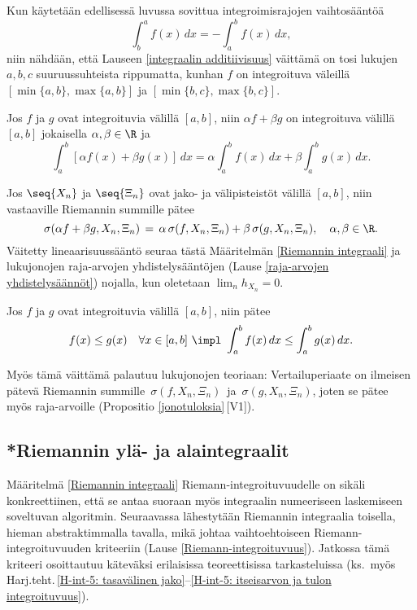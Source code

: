 Kun käytetään edellisessä luvussa sovittua integroimisrajojen vaihtosääntöä
\[
\int_b^a f(x)\, dx=-\int_a^b f(x)\, dx,
\]
niin nähdään, että Lauseen \ref{integraalin additiivisuus} väittämä on tosi lukujen $a,b,c$
suuruussuhteista rippumatta, kunhan $f$ on integroituva väleillä $[\min\{a,b\},\max\{a,b\}]$ ja
$[\min\{b,c\},\max\{b,c\}]$.
\begin{Lause} \label{integraalin lineaarisuus} 
 Jos $f$ ja $g$ ovat integroituvia välillä $[a,b]$, niin
$\alpha f+\beta g$ on integroituva välillä $[a,b]$ jokaisella $\alpha,\beta\in\R$ ja
\[
\int_a^b [\alpha f(x)+\beta g(x)]\,dx = \alpha\int_a^b f(x)\, dx + \beta\int_a^b g(x)\,dx.
\]
\end{Lause}
\tod Jos $\seq{X_n}$ ja $\seq{\Xi_n}$ ovat jako- ja välipisteistöt välillä $[a,b]$, niin
vastaaville Riemannin summille pätee
\[
\sigma(\alpha f+\beta g,X_n,\Xi_n)\,=\,\alpha\,\sigma(f,X_n,\Xi_n)+\beta\,\sigma(g,X_n,\Xi_n),
                                       \quad \alpha,\beta\in\R.
\]
Väitetty lineaarisuussääntö seuraa tästä Määritelmän \ref{Riemannin integraali} ja lukujonojen
raja-arvojen yhdistelysääntöjen (Lause \ref{raja-arvojen yhdistelysäännöt}) nojalla, kun
oletetaan $\lim_nh_{X_n}=0$. \loppu
\begin{Lause} \label{integraalien vertailuperiaate} 
 Jos $f$ ja $g$ ovat integroituvia välillä $[a,b]$,
niin pätee
\[
f(x)\leq g(x)\quad\forall x\in [a,b] \ \impl \ \int_a^b f(x)\, dx\leq\int_a^b g(x)\, dx.
\]
\end{Lause}
\tod Myös tämä väittämä palautuu lukujonojen teoriaan: Vertailuperiaate on ilmeisen pätevä
Riemannin summille $\,\sigma(f,X_n,\Xi_n)\,$ ja $\,\sigma(g,X_n,\Xi_n)$, joten se pätee myös
raja-arvoille (Propositio \ref{jonotuloksia}\,[V1]). \loppu 

 
\subsection{*Riemannin ylä- ja alaintegraalit}

Määritelmä \ref{Riemannin integraali} Riemann-integroituvuudelle on sikäli konkreettiinen, että
se antaa suoraan myös integraalin numeeriseen laskemiseen soveltuvan algoritmin. Seuraavassa
lähestytään Riemannin integraalia toisella, hieman abstraktimmalla tavalla, mikä
johtaa vaihtoehtoiseen Riemann-integroituvuuden kriteeriin (Lause \ref{Riemann-integroituvuus}).
Jatkossa tämä kriteeri osoittautuu käteväksi erilaisissa teoreettisissa tarkasteluissa
(ks.\ myös Harj.teht.\,\ref{H-int-5: tasavälinen jako}--\ref{H-int-5: itseisarvon ja tulon
integroituvuus}).

